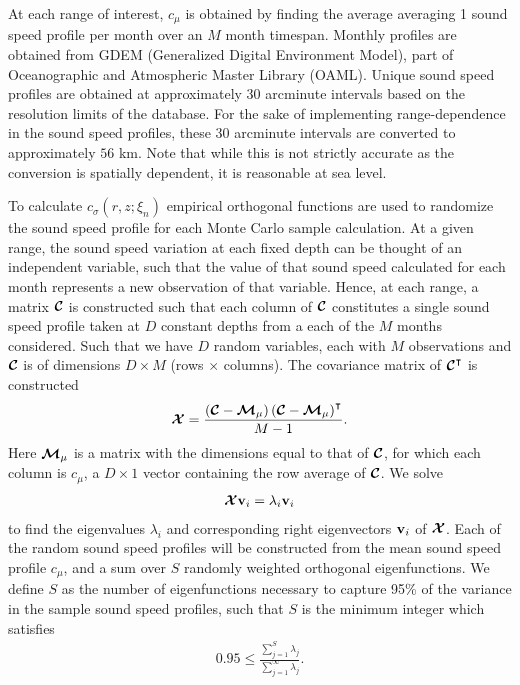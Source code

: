At each range of interest, $c_\mu$ is obtained by finding the average
averaging 1 sound speed profile per month over an $M$ month
timespan. Monthly profiles are obtained from GDEM (Generalized Digital
Environment Model), part of Oceanographic and Atmospheric Master
Library (OAML). Unique sound speed profiles are obtained at
approximately 30 arcminute intervals based on the resolution limits of
the database. For the sake of implementing range-dependence in the
sound speed profiles, these 30 arcminute intervals are converted to
approximately $56$ km. Note that while this is not strictly accurate
as the conversion is spatially dependent, it is reasonable at sea
level.

To calculate $c_\sigma(r,z;\xi_n)$ empirical orthogonal functions are
used to randomize the sound speed profile for each Monte Carlo sample
calculation. At a given range, the sound speed variation at each fixed depth can
be thought of an independent variable, such that the value of that
sound speed calculated for each month represents a new observation of
that variable. Hence, at each range, a matrix $\boldsymbol{\mathcal{C}}$ is
constructed such that each column of $\boldsymbol{\mathcal{C}}$ constitutes a single
sound speed profile taken at $D$ constant depths from a each of the
$M$ months considered. Such that we have $D$ random variables, each
with $M$ observations and $\boldsymbol{\mathcal{C}}$ is of dimensions $D \times M$
(rows $\times$ columns). The covariance matrix of $\boldsymbol{\mathcal{C}}^\intercal$ is
constructed
\begin{align*}
  \boldsymbol{\mathcal{X}} = \frac{\left(\boldsymbol{\mathcal{C}}-\boldsymbol{\mathcal{M}}_\mu\right) \left(\boldsymbol{\mathcal{C}}-\boldsymbol{\mathcal{M}}_\mu\right)^\intercal}{M-1}.
\end{align*}
Here $\boldsymbol{\mathcal{M}}_\mu$ is a matrix with the dimensions equal to that of
$\boldsymbol{\mathcal{C}}$, for which each column is $c_\mu$, a $D \times 1$ vector
containing the row average of $\boldsymbol{\mathcal{C}}$. We solve
\begin{align*}
  \boldsymbol{\mathcal{X}}\boldsymbol{\mathbf{v}}_i = \lambda_i\boldsymbol{\mathbf{v}}_i
\end{align*}
to find the eigenvalues $\lambda_i$ and corresponding right
eigenvectors $\boldsymbol{\mathbf{v}}_i$ of $\boldsymbol{\mathcal{X}}$. Each of the random sound
speed profiles will be constructed from the mean sound speed profile
$c_\mu$, and a sum over $S$ randomly weighted orthogonal
eigenfunctions. We define $S$ as the number of eigenfunctions
necessary to capture 95\% of the variance in the sample sound speed
profiles, such that $S$ is the minimum integer which satisfies
\begin{align*}
  0.95\leq\frac{\sum_{j=1}^S \lambda_j}{\sum_{j=1}^\infty \lambda_j}.
\end{align*}

